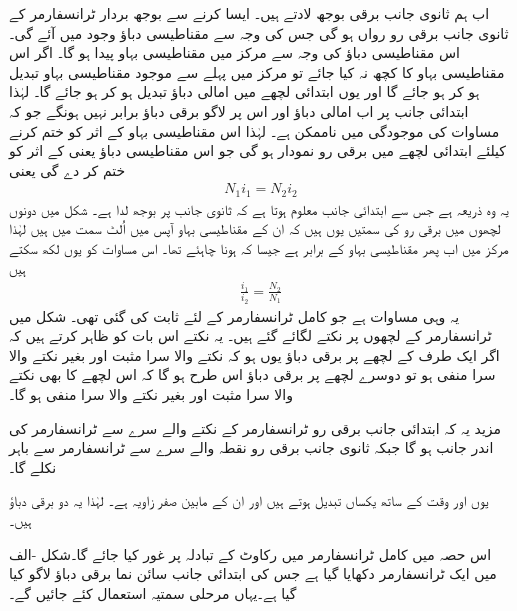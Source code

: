 اب ہم ثانوی جانب  برقی بوجھ لادتے ہیں۔ ایسا کرنے سے بوجھ بردار ٹرانسفارمر  کے  ثانوی جانب  برقی رو  رواں ہو گی جس کی وجہ سے  مقناطیسی دباؤ وجود میں آئے گی۔ اس مقناطیسی دباؤ کی وجہ سے مرکز میں مقناطیسی بہاو   پیدا ہو گا۔ اگر اس مقناطیسی بہاو کا کچھ  نہ کیا جائے تو مرکز میں پہلے سے موجود مقناطیسی بہاو تبدیل ہو کر  ہو جائے گا اور یوں ابتدائی لچھے میں امالی دباؤ تبدیل ہو کر  ہو جائے گا۔  لہٰذا ابتدائی جانب پر اب امالی دباؤ اور اس پر لاگو برقی دباؤ برابر نہیں ہونگے جو کہ مساوات   کی موجودگی میں ناممکن ہے۔ لہٰذا اس مقناطیسی بہاو   کے اثر کو ختم کرنے کیلئے ابتدائی لچھے میں برقی رو  نمودار ہو گی جو اس مقناطیسی دباؤ یعنی  کے اثر کو ختم کر دے گی یعنی
\begin{align}
N_1 i_1=N_2 i_2
\end{align}
یہ وہ ذریعہ ہے جس سے ابتدائی جانب معلوم ہوتا ہے کہ ثانوی جانب پر بوجھ لدا ہے۔ شکل میں دونوں لچھوں میں برقی رو کی سمتیں یوں ہیں کہ ان کے مقناطیسی بہاو آپس میں اُلٹ سمت میں ہیں لہٰذا  مرکز میں اب پھر مقناطیسی بہاو   کے برابر  ہے جیسا کہ ہونا چاہئے تھا۔ اس مساوات کو یوں لکھ سکتے ہیں
\begin{align}\label{مساوات_ٹرانسفارمر_برقی_رو_اور_چکر_شرح}
\frac{i_1}{i_2}=\frac{N_2}{N_1}
\end{align}
یہ وہی مساوات ہے جو کامل ٹرانسفارمر کے لئے ثابت کی گئی تھی۔
%
	شکل   میں ٹرانسفارمر کے لچھوں پر نکتے لگائے گئے ہیں۔ یہ نکتے اس بات کو ظاہر کرتے ہیں کہ اگر ایک طرف کے لچھے پر برقی دباؤ  یوں ہو کہ نکتے والا سرا مثبت اور بغیر نکتے والا سرا منفی ہو تو دوسرے لچھے  پر برقی دباؤ  اس طرح ہو گا کہ اس لچھے کا بھی  نکتے والا سرا مثبت اور بغیر نکتے والا سرا منفی ہو گا۔

مزید یہ کہ ابتدائی جانب برقی رو ٹرانسفارمر کے نکتے والے سرے سے ٹرانسفارمر کی اندر جانب ہو گا جبکہ ثانوی جانب برقی رو نقطہ والے سرے سے ٹرانسفارمر سے باہر نکلے گا۔

 یوں   اور  وقت کے ساتھ یکساں تبدیل ہوتے ہیں اور ان کے مابین صفر زاویہ ہے۔ لہٰذا یہ دو برقی دباؤ  ہیں۔

اس حصہ میں کامل ٹرانسفارمر میں رکاوٹ کے تبادلہ پر غور کیا جائے گا۔شکل -الف میں ایک ٹرانسفارمر دکھایا گیا ہے جس کی ابتدائی جانب سائن نما برقی دباؤ    لاگو کیا گیا ہے۔یہاں مرحلی سمتیہ استعمال کئے جائیں گے۔

